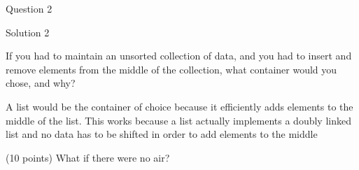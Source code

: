 \documentclass[10pt,answers,addpoints]{exam}
\begin{document}
\begin{questions}
\par\vspace{0.100000in}\begin{minipage}{\linewidth}
\question[8]
Question 2
\begin{solutionbox}{0in}
Solution 2
\end{solutionbox}
\end{minipage}


\par\vspace{0.100000in}\begin{minipage}{\linewidth}
\question[10]

If you had to maintain an unsorted collection of data, and you had to insert
and remove elements from the middle of the collection, what container would
you chose, and why?

\begin{solutionbox}{3in}

A list would be the container of choice because it efficiently adds elements
to the middle of the list. This works because a list actually implements a
doubly linked list and no data has to be shifted in order to add elements to
the middle

\end{solutionbox}
\end{minipage}


\par\vspace{0.100000in}\begin{minipage}{\linewidth}
\question (10 points) What if there were no air?
\end{minipage}



\end{questions}
\end{document}
